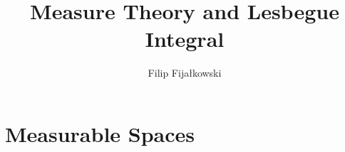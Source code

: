 \documentclass{book}
\title{Measure Theory and Lesbegue Integral}
\author{Filip Fijałkowski}
\date{}
\theoremstyle{theorem}
\theoremstyle{definition}
\begin{document}
\maketitle
\tableofcontents

\chapter{Measurable Spaces}

\end{document}
